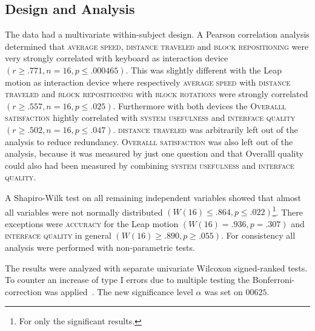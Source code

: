 \subsection{Design and Analysis}
The data had a multivariate within-subject design. A Pearson correlation analysis determined that \textsc{average speed}, \textsc{distance traveled} and \textsc{block repositioning} were very strongly correlated with keyboard as interaction device $(r \geq .771, n = 16, p \leq .000465)$. This was slightly different with the Leap motion as interaction device where respectively \textsc{average speed} with \textsc{distance traveled} and \textsc{block repositioning} with \textsc{block rotations} were strongly correlated $(r  \geq .557, n = 16, p \leq .025)$. Furthermore with both devices the \textsc{Overalll satisfaction} hightly correlated with \textsc{system usefulness} and \textsc{interface quality}$(r  \geq .502, n = 16, p \leq .047)$. \textsc{distance traveled} was arbitrarily left out of the analysis to reduce redundancy.  \textsc{Overalll satisfaction} was also left out of the analysis, because it was measured by just one question and that Overalll quality could also had been measured by combining \textsc{system usefulness} and \textsc{interface quality}. 

A Shapiro-Wilk test on all remaining independent variables showed that almost all variables were not normally distributed $(W(16) \leq .864, p \leq .022 )$\footnote{For only the significant results.}. There exceptions were \textsc{accuracy} for the Leap motion $(W(16) = .936, p = .307)$ and \textsc{interface quality} in general $(W(16) \geq .890, p \geq .055)$. For consistency all analysis were performed with non-parametric tests.

The results were analyzed with separate univariate Wilcoxon signed-ranked tests. To counter an increase of type I errors due to multiple testing the Bonferroni-correction was applied~\cite{dunn61}. The new significance level $\alpha$ was set on $00625$.
